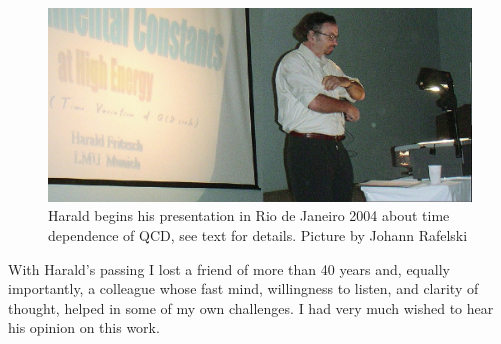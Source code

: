 \documentclass{ws-ijmpa}
\begin{document}
\begin{figure}%
\centerline{\includegraphics[width=0.99\columnwidth]{04RANPHarald1Ed.jpg}}
\caption{Harald begins his presentation in Rio de Janeiro 2004 about time dependence of QCD, see text for details. Picture by Johann Rafelski
}
\label{Fig:RANP2004} 
\end{figure}

With Harald's passing I lost a friend of more than 40 years and, equally importantly, a colleague whose fast mind, willingness to listen, and clarity of thought, helped in some of my own challenges. I had very much wished to hear his opinion on this work.



\end{document}
